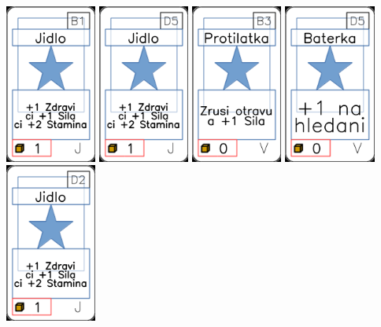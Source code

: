 \documentclass[a4paper]{article}
\begin{document}
	\includegraphics[width=3.0cm]{img-1_5}
	\includegraphics[width=3.0cm]{img-1_19}
	\includegraphics[width=3.0cm]{img-1_67}
	\includegraphics[width=3.0cm]{img-1_79}
	\includegraphics[width=3.0cm]{img-1_16}
\end{document}
